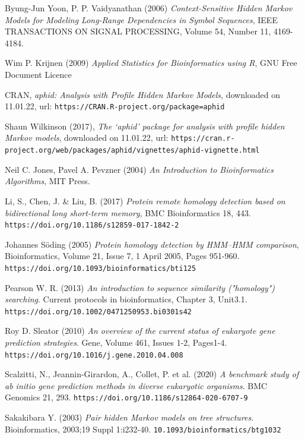 \documentclass{article}\usepackage[]{graphicx}\usepackage[]{color}
\begin{document}
\begin{thebibliography}{20}
Byung-Jun Yoon, P. P. Vaidyanathan (2006) \emph{Context-Sensitive Hidden Markov Models for Modeling Long-Range Dependencies in Symbol Sequences}, IEEE TRANSACTIONS ON SIGNAL PROCESSING, Volume 54, Number 11, 4169-4184.

Wim P. Krijnen (2009) \emph{Applied Statistics for Bioinformatics using R}, GNU Free Document Licence

CRAN, \emph{aphid: Analysis with Profile Hidden Markov Models}, downloaded on 11.01.22, 
url: \verb$https://CRAN.R-project.org/package=aphid$

Shaun Wilkinson (2017), \emph{The ‘aphid’ package for analysis with profile hidden Markov models}, downloaded on 11.01.22, 
url: \verb$https://cran.r-project.org/web/packages/aphid/vignettes/aphid-vignette.html$

Neil C. Jones, Pavel A. Pevzner (2004) \emph{An Introduction to Bioinformatics Algorithms}, MIT Press. 

Li, S., Chen, J. \& Liu, B. (2017) \emph{Protein remote homology detection based on bidirectional long short-term memory}, BMC Bioinformatics 18, 443. \verb$https://doi.org/10.1186/s12859-017-1842-2$

Johannes Söding (2005) \emph{Protein homology detection by HMM–HMM comparison}, Bioinformatics, Volume 21, Issue 7, 1 April 2005, Pages 951-960. \verb$https://doi.org/10.1093/bioinformatics/bti125$

Pearson W. R. (2013) \emph{An introduction to sequence similarity ("homology") searching}. Current protocols in bioinformatics, Chapter 3, Unit3.1. \verb$https://doi.org/10.1002/0471250953.bi0301s42$

Roy D. Sleator (2010) \emph{An overview of the current status of eukaryote gene prediction strategies}. Gene, Volume 461, Issues 1-2, Pages1-4. \verb$https://doi.org/10.1016/j.gene.2010.04.008$

Scalzitti, N., Jeannin-Girardon, A., Collet, P. et al. (2020) \emph{A benchmark study of ab initio gene prediction methods in diverse eukaryotic organisms}. BMC Genomics 21, 293. \verb$https://doi.org/10.1186/s12864-020-6707-9$

Sakakibara Y. (2003) \emph{Pair hidden Markov models on tree structures}. Bioinformatics, 2003;19 Suppl 1:i232-40. \verb$10.1093/bioinformatics/btg1032$

\end{thebibliography}
\end{document}
